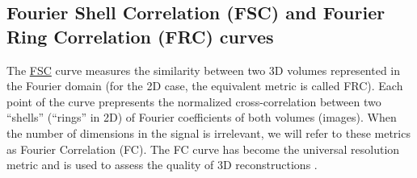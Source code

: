 \documentclass{article}
\begin{document}

\subsection{Fourier Shell Correlation (FSC) and Fourier Ring
  Correlation (FRC) curves}
\label{sec:fourier_correlation}

The
\href{https://en.wikipedia.org/wiki/Fourier_shell_correlation}{FSC}
curve measures the similarity between two 3D volumes represented in
the Fourier domain \cite{verbeke2024self} (for the 2D case, the
equivalent metric is called FRC). Each point of the curve prepresents
the normalized cross-correlation between two ``shells'' (``rings'' in
2D) of Fourier coefficients of both volumes (images). When the number
of dimensions in the signal is irrelevant, we will refer to these
metrics as Fourier Correlation (FC). The FC curve has become the
universal resolution metric and is used to assess the quality of 3D
reconstructions \cite{rosenthal2003optimal,scheres2012prevention}.

\end{document}
